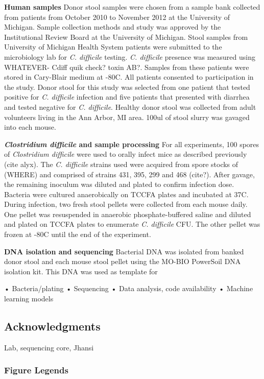 \documentclass[11pt,]{article}
\begin{document}
\textbf{Human samples} Donor stool samples were chosen from a sample
bank collected from patients from October 2010 to November 2012 at the
University of Michigan. Sample collection methods and study was approved
by the Institutional Review Board at the University of Michigan. Stool
samples from University of Michigan Health System patients were
submitted to the microbiology lab for \emph{C. difficile} testing.
\emph{C. difficile} presence was measured using WHATEVER- Cdiff quik
check? toxin AB?. Samples from these patients were stored in Cary-Blair
medium at -80C. All patients consented to participation in the study.
Donor stool for this study was selected from one patient that tested
positive for \emph{C. difficile} infection and five patients that
presented with diarrhea and tested negative for \emph{C. difficile}.
Healthy donor stool was collected from adult volunteers living in the
Ann Arbor, MI area. 100ul of stool slurry was gavaged into each mouse.

\textbf{\emph{Clostridium difficile} and sample processing} For all
experiments, 100 spores of \emph{Clostridium difficile} were used to
orally infect mice as described previously (cite alyx). The \emph{C.
difficile} strains used were acquired from spore stocks of (WHERE) and
comprised of strains 431, 395, 299 and 468 (cite?). After gavage, the
remaining inoculum was diluted and plated to confirm infection dose.
Bacteria were cultured anaerobically on TCCFA plates and incubated at
37C. During infection, two fresh stool pellets were collected from each
mouse daily. One pellet was resuspended in anaerobic phosphate-buffered
saline and diluted and plated on TCCFA plates to enumerate \emph{C.
difficile} CFU. The other pellet was frozen at -80C until the end of the
experiment.

\textbf{DNA isolation and sequencing} Bacterial DNA was isolated from
banked donor stool and each mouse stool pellet using the MO-BIO
PowerSoil DNA isolation kit. This DNA was used as template for

• Bacteria/plating • Sequencing • Data analysis, code availability •
Machine learning models

\subsection{Acknowledgments}\label{acknowledgments}

Lab, sequencing core, Jhansi

\newpage

\subsubsection{Figure Legends}\label{figure-legends}
\end{document}
